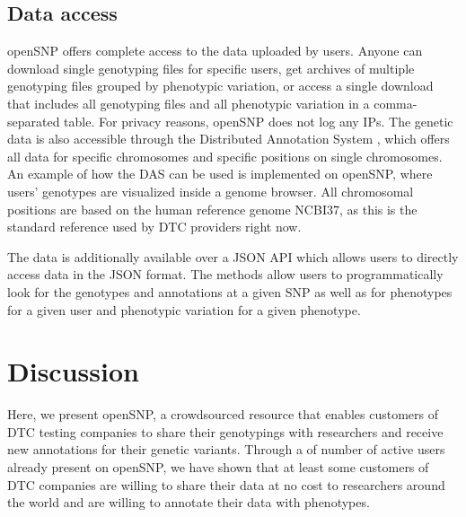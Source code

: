 \documentclass[10pt]{article}
\begin{document}
\subsection*{Data access}
openSNP offers complete access to the data uploaded by users. Anyone can download single genotyping files for specific users, get archives of multiple genotyping files 
grouped by phenotypic variation, or access a single download that includes all genotyping files and all phenotypic variation in a comma-separated table. For privacy reasons, openSNP does not log any IPs. The genetic data is also 
accessible through the Distributed Annotation System \cite{Dowell2001,Jenkinson2008}, which offers all data for specific chromosomes and specific positions on single chromosomes. 
An example of how the DAS can be used is implemented on openSNP, where users' genotypes are visualized inside a genome browser. All chromosomal positions are based on the human reference genome NCBI37, as this is the standard reference used by DTC providers right now.

The data is additionally available over a JSON API which allows users to directly access data in the JSON format. The methods allow users to programmatically look for the genotypes and annotations at a given SNP as well as for phenotypes for a given user and phenotypic variation for a given phenotype.

\section*{Discussion}

%
%
Here, we present openSNP, a crowdsourced resource that enables customers of DTC testing companies to share their genotypings with researchers and receive new annotations for their genetic variants. Through a of number of active users already present on openSNP, we have shown that at least some customers of DTC companies are willing to share their data at no cost to researchers around the world and are willing to annotate their data with phenotypes.
\end{document}
